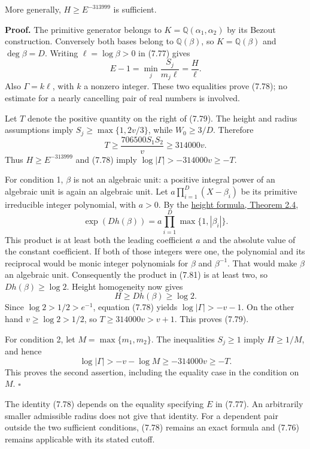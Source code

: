 \documentclass[
  11pt,
  a4paper,
]{article}
\begin{document}
More generally, \(H\ge E^{-313999}\) is sufficient.

\textbf{Proof.} The primitive generator belongs to
\(K=\mathbb Q(\alpha_1,\alpha_2)\) by its Bezout construction.
Conversely both bases belong to \(\mathbb Q(\beta)\), so
\(K=\mathbb Q(\beta)\) and \(\deg\beta=D\). Writing \(\ell=\log\beta>0\)
in (7.77) gives \[
E-1=\min_j\frac{S_j}{m_j\ell}=\frac H\ell.
\] Also \(\Gamma=k\ell\), with \(k\) a nonzero integer. These two
equalities prove (7.78); no estimate for a nearly cancelling pair of
real numbers is involved.

Let \(T\) denote the positive quantity on the right of (7.79). The
height and radius assumptions imply \(S_j\ge\max\{1,2v/3\}\), while
\(W_0\ge3/D\). Therefore \[
T\ge\frac{706500S_1S_2}{v}\ge314000v.
\tag{7.80}
\] Thus \(H\ge E^{-313999}\) and (7.78) imply
\(\log|\Gamma|>-314000v\ge-T\).

For condition 1, \(\beta\) is not an algebraic unit: a positive integral
power of an algebraic unit is again an algebraic unit. Let
\(a\prod_{i=1}^D(X-\beta_i)\) be its primitive irreducible integer
polynomial, with \(a>0\). By the
\href{https://kokunoyumeto.github.io/open-math-courses-public/courses/TR-TRANS/TR-TRANS-02.html\#theorem-2-4-independence-of-field-and-the-polynomial-formula}{height
formula, Theorem 2.4}, \[
\exp(Dh(\beta))=a\prod_{i=1}^D\max\{1,|\beta_i|\}.
\tag{7.81}
\] This product is at least both the leading coefficient \(a\) and the
absolute value of the constant coefficient. If both of those integers
were one, the polynomial and its reciprocal would be monic integer
polynomials for \(\beta\) and \(\beta^{-1}\). That would make \(\beta\)
an algebraic unit. Consequently the product in (7.81) is at least two,
so \(Dh(\beta)\ge\log2\). Height homogeneity now gives \[
H\ge Dh(\beta)\ge\log2.
\] Since \(\log2>1/2>e^{-1}\), equation (7.78) yields
\(\log|\Gamma|>-v-1\). On the other hand \(v\ge\log2>1/2\), so
\(T\ge314000v>v+1\). This proves (7.79).

For condition 2, let \(M=\max\{m_1,m_2\}\). The inequalities \(S_j\ge1\)
imply \(H\ge1/M\), and hence \[
\log|\Gamma|>-v-\log M
\ge-314000v\ge-T.
\] This proves the second assertion, including the equality case in the
condition on \(M\). \(\square\)

The identity (7.78) depends on the equality specifying \(E\) in (7.77).
An arbitrarily smaller admissible radius does not give that identity.
For a dependent pair outside the two sufficient conditions, (7.78)
remains an exact formula and (7.76) remains applicable with its stated
cutoff.
\end{document}
